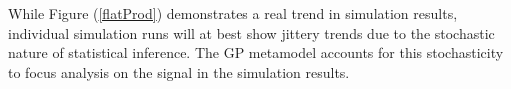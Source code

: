 
%
While Figure (\ref{flatProd}) demonstrates a real trend in simulation results,
individual simulation runs will at best show jittery trends due to the stochastic
nature of statistical inference. The GP metamodel accounts for this
stochasticity %
to focus analysis on the signal in the simulation results. 

%


